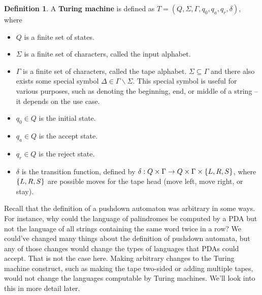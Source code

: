 \documentclass[]{article}
\DeclarePairedDelimiter{\set}{\lbrace}{\rbrace}
\theoremstyle{definition}
\newtheorem*{defn}{Definition}
\begin{document}
      \begin{defn}
        A \textbf{Turing machine} is defined as $T = (Q, \Sigma, \Gamma, q_0, q_a, q_r, \delta)$, where
        \begin{itemize}
          \item $Q$ is a finite set of states.
          \item $\Sigma$ is a finite set of characters, called the input alphabet.
          \item $\Gamma$ is a finite set of characters, called the tape alphabet. $\Sigma \subseteq \Gamma$ and there also exists some special symbol $\Delta \in \Gamma \backslash \Sigma$. This special symbol is useful for various purposes, such as denoting the beginning, end, or middle of a string -- it depends on the use case.
          \item $q_0 \in Q$ is the initial state.
          \item $q_a \in Q$ is the accept state.
          \item $q_r \in Q$ is the reject state.
          \item $\delta$ is the transition function, defined by $\delta : Q \times \Gamma \to Q \times \Gamma \times \set{L, R, S}$, where $\set{L, R, S}$ are possible moves for the tape head (move left, move right, or stay).
        \end{itemize}
      \end{defn}

      Recall that the definition of a pushdown automaton was arbitrary in some ways. For instance, why could the language of palindromes be computed by a PDA but not the language of all strings containing the same word twice in a row? We could've changed many things about the definition of pushdown automata, but any of those changes would change the types of languages that PDAs could accept. That is not the case here. Making arbitrary changes to the Turing machine construct, such as making the tape two-sided or adding multiple tapes, would not change the languages computable by Turing machines. We'll look into this in more detail later.
\end{document}
